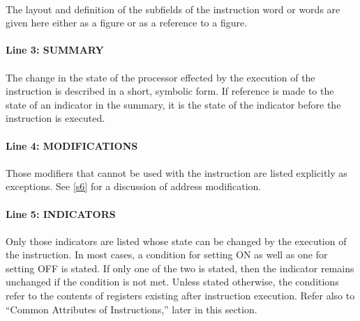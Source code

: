 \paragraph {}

The layout and definition of the subfields of the instruction word or words are given here
either as a figure or as a reference to a figure.

\paragraph {Line 3: SUMMARY}
\paragraph {}

The change in the state of the processor effected by the execution of the instruction is
described in a short, symbolic form. If reference is made to the state of an indicator in the
summary, it is the state of the indicator before the instruction is executed.

\paragraph {Line 4: MODIFICATIONS}
\paragraph {}

Those modifiers that cannot be used with the instruction are listed explicitly as exceptions.
See \ref{s6} for a discussion of address modification.

\paragraph {Line 5: INDICATORS}
\paragraph {}

Only those indicators are listed whose state can be changed by the execution of the
instruction. In most cases, a condition for setting ON as well as one for setting OFF is stated. If
only one of the two is stated, then the indicator remains unchanged if the condition is not met.
Unless stated otherwise, the conditions refer to the contents of registers existing after instruction
execution. Refer also to {``}Common Attributes of Instructions,'' later in this section.

